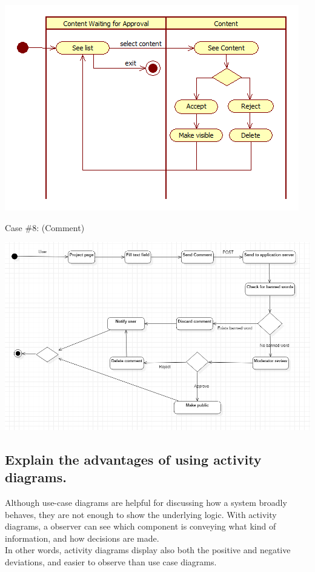 			\includegraphics[width=\textwidth]{images/ActivityDiagram1.png}
		
	\noindent Case \#8:
	(Comment)
			
	\includegraphics[width=\textwidth]{images/UseCase8_Comment.png}		
		
		\subsection{Explain the advantages of using activity diagrams.}
		
		Although use-case diagrams are helpful for discussing how a system broadly behaves, they are not enough to show the underlying logic. With activity diagrams, a observer can see which component is conveying what kind of information, and how decisions are made.\\
		
		In other words, activity diagrams display also both the positive and negative deviations, and easier to observe than use case diagrams.